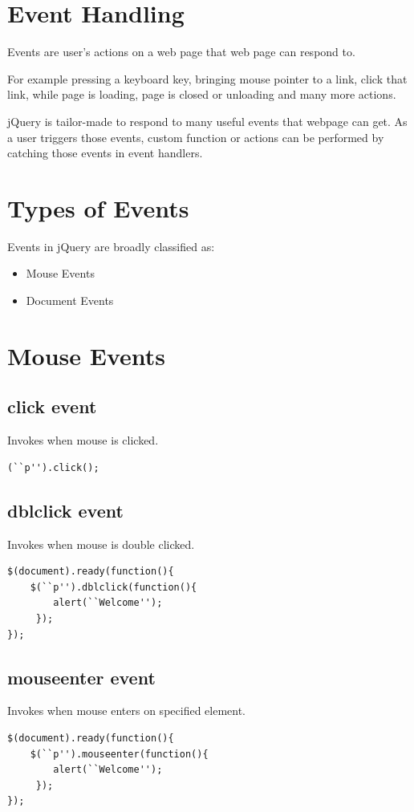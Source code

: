 \documentclass[11pt,a4paper]{article}
\begin{document}
\section*{Event Handling}
Events are user’s actions on a web page that web page can respond to. 

For example pressing a keyboard key, bringing mouse pointer to a link, click that link, while page is loading, page is closed or unloading and many more actions.

jQuery is tailor-made to respond to many useful events that webpage can get. As a user triggers those events, custom function or actions can be performed by catching those events in event handlers.
\section*{Types of Events}
Events in jQuery are broadly classified as:
\begin{itemize}
 \item Mouse Events
 \item Document Events
\end{itemize}
\section*{Mouse Events}
\subsection*{click event}
Invokes when mouse is clicked.
\begin{lstlisting}
(``p'').click();
\end{lstlisting}
\subsection*{dblclick event}
Invokes when mouse is double clicked.
\begin{lstlisting}
$(document).ready(function(){
    $(``p'').dblclick(function(){
        alert(``Welcome'');
     });
}); 
\end{lstlisting}
\subsection*{mouseenter event}
Invokes when mouse enters on specified element.
\begin{lstlisting}
$(document).ready(function(){
    $(``p'').mouseenter(function(){
        alert(``Welcome'');
     });
}); 
\end{lstlisting}
\end{document}
